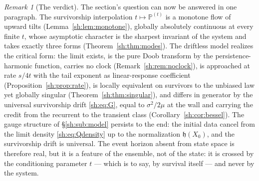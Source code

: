\documentclass[11pt]{article}
\numberwithin{equation}{section}
\theoremstyle{plain}
\theoremstyle{definition}
\theoremstyle{remark}
\newtheorem{remark}[theorem]{Remark}
\newcommand{\PP}{\mathbb{P}}
\newcommand{\hm}{\mathfrak{h}}
\begin{document}
\begin{remark}[The verdict]\label{sh:rem:verdict}
The section's question can now be answered in one paragraph. The
survivorship interpolation $t\mapsto\PP^{(t)}$ is a monotone flow of
upward tilts (Lemma~\ref{sh:lem:monotone}), globally absolutely
continuous at every finite $t$, whose asymptotic character is the
sharpest invariant of the system and takes exactly three forms
(Theorem~\ref{sh:thm:modes}). The driftless model realizes the critical
form: the limit exists, is the pure Doob transform by the
persistence-harmonic function, carries no clock
(Remark~\ref{sh:rem:noclock}), is approached at rate $s/4t$ with the tail
exponent as linear-response coefficient
(Proposition~\ref{sh:prop:rate}), is locally equivalent on survivors to
the unbiased law yet globally singular
(Theorem~\ref{sh:thm:singular}), and differs in generator by the
universal survivorship drift \eqref{sh:eq:G}, equal to $\sigma^2/2\mu$
at the wall and carrying the credit from the recurrent to the transient
class (Corollary~\ref{sh:cor:bessel}). The gauge structure of
\S\ref{sh:sub:model} persists to the end: the initial data cancel from
the limit density \eqref{sh:eq:Qdensity} up to the normalization
$\hm(X_0)$, and the survivorship drift is universal. The event horizon
absent from state space is therefore real, but it is a feature of the
ensemble, not of the state: it is crossed by the conditioning parameter
$t$ --- which is to say, by survival itself --- and never by the system.
\end{remark}
\end{document}
